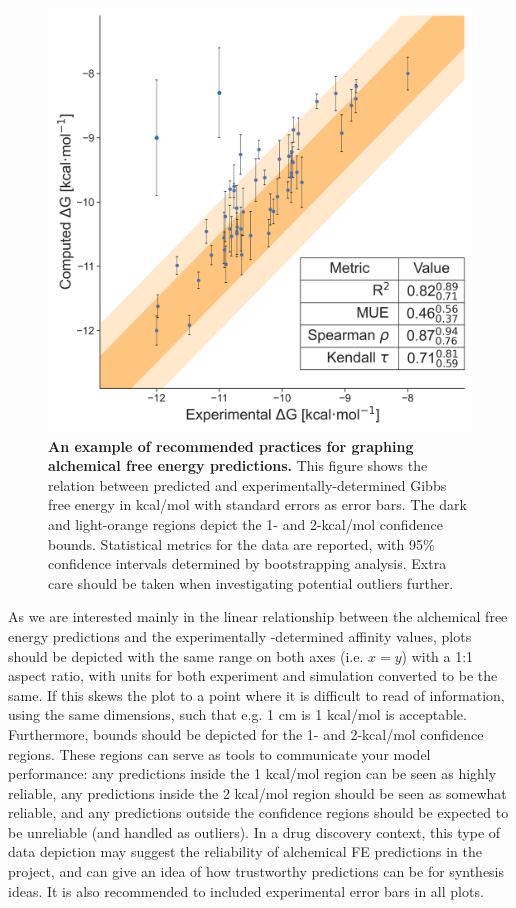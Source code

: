 \documentclass[9pt,bestpractices]{livecoms}
\begin{document}
\begin{figure}
  \includegraphics[width=0.95\linewidth]{figures/fig13_analysis_practices/Figure.png}
  \caption{\textbf{An example of recommended practices for graphing alchemical free energy predictions.} This figure shows the relation between predicted and experimentally-determined Gibbs free energy in kcal/mol with standard errors as error bars. The dark and light-orange regions depict the 1- and 2-kcal/mol confidence bounds. Statistical metrics for the data are reported, with 95\% confidence intervals determined by bootstrapping analysis. Extra care should be taken when investigating potential outliers further.}
   \label{fig:scatterplot_analysis}
\end{figure}

As we are interested mainly in the linear relationship between the alchemical free energy predictions and the experimentally -determined affinity values, plots should be depicted with the same range on both axes (i.e. $x=y$) with a 1:1 aspect ratio, with units for both experiment and simulation converted to be the same. If this skews the plot to a point where it is difficult to read of information, using the same dimensions, such that e.g. 1 cm is 1 kcal/mol is acceptable. Furthermore, bounds should be depicted for the 1- and 2-kcal/mol confidence regions. These regions can serve as tools to communicate your model performance: any predictions inside the 1 kcal/mol region can be seen as highly reliable, any predictions inside the 2 kcal/mol region should be seen as somewhat reliable, and any predictions outside the confidence regions should be expected to be unreliable (and handled as outliers). In a drug discovery context, this type of data depiction may suggest the reliability of alchemical FE predictions in the project, and can give an idea of how trustworthy predictions can be for synthesis ideas. It is also recommended to included experimental error bars in all plots.
\end{document}
